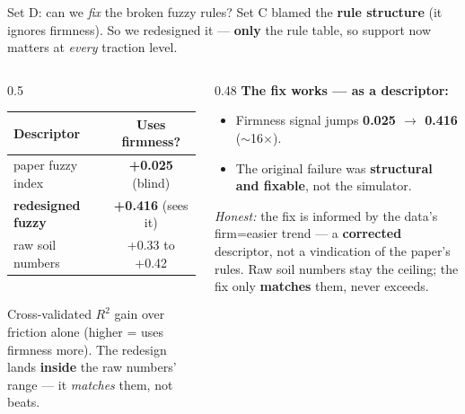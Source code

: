 \documentclass[aspectratio=169]{beamer}
\newcommand{\good}[1]{\textcolor{green!55!black}{\textbf{#1}}}
\newcommand{\bad}[1]{\textcolor{red!70!black}{\textbf{#1}}}
\begin{document}
\begin{frame}{Set D: can we \textit{fix} the broken fuzzy rules?}
  Set C blamed the \textbf{rule structure} (it ignores firmness). So we redesigned it ---
  \textbf{only} the rule table, so support now matters at \textit{every} traction level.
  \begin{columns}
    \begin{column}{0.5\textwidth}
      \centering
      \renewcommand{\arraystretch}{1.2}
      \begin{tabular}{@{}lc@{}}
        \toprule
        \textbf{Descriptor} & \textbf{Uses firmness?} \\
        \midrule
        paper fuzzy index         & \bad{+0.025} (blind) \\
        \textbf{redesigned fuzzy} & \good{+0.416} (sees it) \\
        raw soil numbers          & +0.33 to +0.42 \\
        \bottomrule
      \end{tabular}\\[4pt]
      \footnotesize Cross-validated $R^2$ gain over friction alone (higher = uses firmness more).
      The redesign lands \textbf{inside} the raw numbers' range --- it \textit{matches} them, not beats.
    \end{column}
    \begin{column}{0.48\textwidth}
      \good{The fix works — as a descriptor:}
      \begin{itemize}
        \item Firmness signal jumps \textbf{0.025 $\to$ 0.416} ($\sim$16$\times$).
        \item The original failure was \textbf{structural and fixable}, not the simulator.
      \end{itemize}
      \footnotesize \textit{Honest:} the fix is informed by the data's firm=easier trend —
      a \textbf{corrected} descriptor, not a vindication of the paper's rules. Raw soil
      numbers stay the ceiling; the fix only \textbf{matches} them, never exceeds.
    \end{column}
  \end{columns}
\end{frame}
\end{document}
